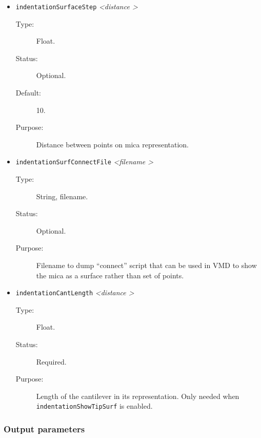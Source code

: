 \documentclass[a4paper]{article}
\begin{document}
\begin{itemize}
\item \texttt{indentationSurfaceStep} \textit{\textless distance \textgreater}
\begin{description}
\item[Type:] Float.
\item[Status:] Optional.
\item[Default:] 10.
\item[Purpose:] Distance between points on mica representation.
\end{description}

\item \texttt{indentationSurfConnectFile} \textit{\textless filename \textgreater}
\begin{description}
\item[Type:] String, filename.
\item[Status:] Optional.
\item[Purpose:] Filename to dump ``connect'' script that can be used in VMD to show the mica as a surface rather than set of points.
\end{description}

\item \texttt{indentationCantLength} \textit{\textless distance \textgreater}
\begin{description}
\item[Type:] Float.
\item[Status:] Required.
\item[Purpose:] Length of the cantilever in its representation. Only needed when \texttt{indentationShowTipSurf} is enabled.
\end{description}

\end{itemize}
   
\subsubsection{Output parameters}
\label{sec:par.output}
\end{document}
